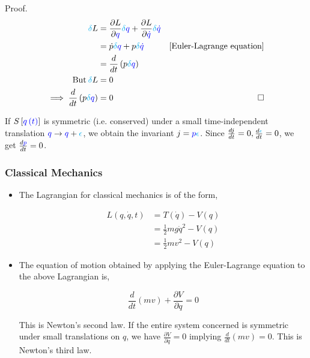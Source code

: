 \documentclass{beamer}
\begin{document}
\begin{frame}
\begin{block}{Proof.}
\begin{align*}
\textcolor{cyan}{\delta} L & = \frac{\partial L}{\partial \textcolor{blue}{q}} \textcolor{cyan}{\delta} \textcolor{blue}{q} + \frac{\partial L}{\partial \textcolor{blue}{\dot{q}}} \textcolor{cyan}{\delta} \textcolor{blue}{\dot{q}} \\
& = \dot{p} \textcolor{cyan}{\delta} \textcolor{blue}{q} + p \textcolor{cyan}{\delta} \textcolor{blue}{\dot{q}} & \left[ \text{Euler-Lagrange equation} \right] \\
& = \frac{d}{dt} \left( p \textcolor{cyan}{\delta} \textcolor{blue}{q} \right) \\
\text{But} \: \textcolor{cyan}{\delta} L & = 0 \\
\implies \frac{d}{dt} \left( p \textcolor{cyan}{\delta} \textcolor{blue}{q} \right) & = 0 & \square
\end{align*}
\end{block}

\begin{example}
If $S \left[ \textcolor{blue}{q \left( t \right)} \right]$ is symmetric (i.e. conserved) under a small time-independent translation $\textcolor{blue}{q} \to \textcolor{blue}{q} + \textcolor{cyan}{\epsilon}$, we obtain the invariant $j = \textcolor{blue}{p} \textcolor{cyan}{\epsilon}$. Since $\frac{dj}{dt} = 0, \frac{d \textcolor{cyan}{\epsilon}}{dt} = 0$, we get $\frac{d \textcolor{blue}{p}}{dt} = 0$.
\end{example}
\end{frame}

\begin{frame}
\frametitle{Classical Mechanics}

\begin{itemize}
\item The Lagrangian for classical mechanics is of the form,

\begin{align*}
L \left( q, \dot{q}, t \right) & = T \left( \dot{q} \right) - V \left( q \right) \\
& = \frac{1}{2} m \mathit{g} \dot{q}^2 - V \left( q \right) \\
& = \frac{1}{2} mv^2 - V \left( q \right)
\end{align*}

\item The equation of motion obtained by applying the Euler-Lagrange equation to the above Lagrangian is,

$$\frac{d}{dt} \left( m v \right) + \frac{\partial V}{\partial q} = 0$$

This is Newton's second law. If the entire system concerned is symmetric under small translations on $q$, we have $\frac{\partial V}{\partial q} = 0$ implying $\frac{d}{dt} \left( m v \right) = 0$. This is Newton's third law.
\end{itemize}
\end{frame}
\end{document}
